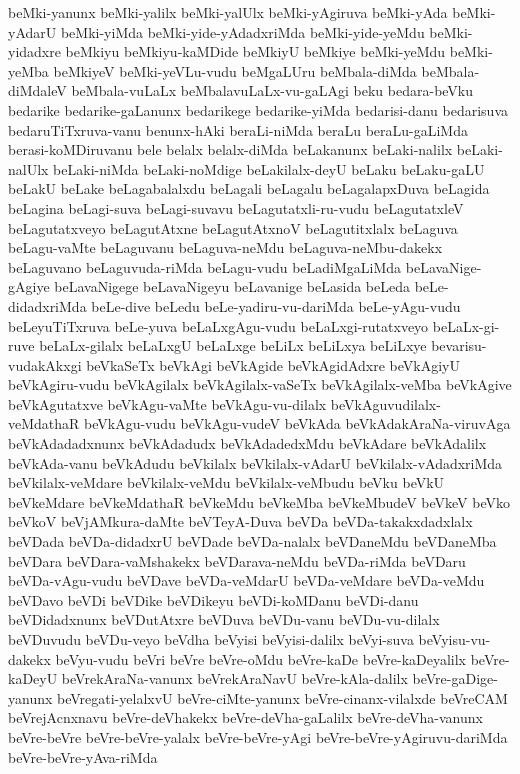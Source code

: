 {beMki-yanunx
beMki-yalilx
beMki-yalUlx
beMki-yAgiruva
beMki-yAda
beMki-yAdarU
beMki-yiMda
beMki-yide-yAdadxriMda
beMki-yide-yeMdu
beMki-yidadxre
beMkiyu
beMkiyu-kaMDide
beMkiyU
beMkiye
beMki-yeMdu
beMki-yeMba
beMkiyeV
beMki-yeVLu-vudu
beMgaLUru
beMbala-diMda
beMbala-diMdaleV
beMbala-vuLaLx
beMbalavuLaLx-vu-gaLAgi
beku
bedara-beVku
bedarike
bedarike-gaLanunx
bedarikege
bedarike-yiMda
bedarisi-danu
bedarisuva
bedaruTiTxruva-vanu
benunx-hAki
beraLi-niMda
beraLu
beraLu-gaLiMda
berasi-koMDiruvanu
bele
belalx
belalx-diMda
beLakanunx
beLaki-nalilx
beLaki-nalUlx
beLaki-niMda
beLaki-noMdige
beLakilalx-deyU
beLaku
beLaku-gaLU
beLakU
beLake
beLagabalalxdu
beLagali
beLagalu
beLagalapxDuva
beLagida
beLagina
beLagi-suva
beLagi-suvavu
beLagutatxli-ru-vudu
beLagutatxleV
beLagutatxveyo
beLagutAtxne
beLagutAtxnoV
beLagutitxlalx
beLaguva
beLagu-vaMte
beLaguvanu
beLaguva-neMdu
beLaguva-neMbu-dakekx
beLaguvano
beLaguvuda-riMda
beLagu-vudu
beLadiMgaLiMda
beLavaNige-gAgiye
beLavaNigege
beLavaNigeyu
beLavanige
beLasida
beLeda
beLe-didadxriMda
beLe-dive
beLedu
beLe-yadiru-vu-dariMda
beLe-yAgu-vudu
beLeyuTiTxruva
beLe-yuva
beLaLxgAgu-vudu
beLaLxgi-rutatxveyo
beLaLx-gi-ruve
beLaLx-gilalx
beLaLxgU
beLaLxge
beLiLx
beLiLxya
beLiLxye
bevarisu-vudakAkxgi
beVkaSeTx
beVkAgi
beVkAgide
beVkAgidAdxre
beVkAgiyU
beVkAgiru-vudu
beVkAgilalx
beVkAgilalx-vaSeTx
beVkAgilalx-veMba
beVkAgive
beVkAgutatxve
beVkAgu-vaMte
beVkAgu-vu-dilalx
beVkAguvudilalx-veMdathaR
beVkAgu-vudu
beVkAgu-vudeV
beVkAda
beVkAdakAraNa-viruvAga
beVkAdadadxnunx
beVkAdadudx
beVkAdadedxMdu
beVkAdare
beVkAdalilx
beVkAda-vanu
beVkAdudu
beVkilalx
beVkilalx-vAdarU
beVkilalx-vAdadxriMda
beVkilalx-veMdare
beVkilalx-veMdu
beVkilalx-veMbudu
beVku
beVkU
beVkeMdare
beVkeMdathaR
beVkeMdu
beVkeMba
beVkeMbudeV
beVkeV
beVko
beVkoV
beVjAMkura-daMte
beVTeyA-Duva
beVDa
beVDa-takakxdadxlalx
beVDada
beVDa-didadxrU
beVDade
beVDa-nalalx
beVDaneMdu
beVDaneMba
beVDara
beVDara-vaMshakekx
beVDarava-neMdu
beVDa-riMda
beVDaru
beVDa-vAgu-vudu
beVDave
beVDa-veMdarU
beVDa-veMdare
beVDa-veMdu
beVDavo
beVDi
beVDike
beVDikeyu
beVDi-koMDanu
beVDi-danu
beVDidadxnunx
beVDutAtxre
beVDuva
beVDu-vanu
beVDu-vu-dilalx
beVDuvudu
beVDu-veyo
beVdha
beVyisi
beVyisi-dalilx
beVyi-suva
beVyisu-vu-dakekx
beVyu-vudu
beVri
beVre
beVre-oMdu
beVre-kaDe
beVre-kaDeyalilx
beVre-kaDeyU
beVrekAraNa-vanunx
beVrekAraNavU
beVre-kAla-dalilx
beVre-gaDige-yanunx
beVregati-yelalxvU
beVre-ciMte-yanunx
beVre-cinanx-vilalxde
beVreCAM
beVrejAcnxnavu
beVre-deVhakekx
beVre-deVha-gaLalilx
beVre-deVha-vanunx
beVre-beVre
beVre-beVre-yalalx
beVre-beVre-yAgi
beVre-beVre-yAgiruvu-dariMda
beVre-beVre-yAva-riMda
}
